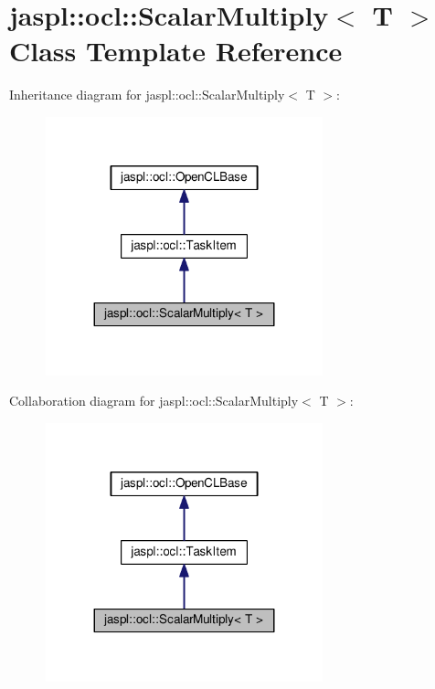 \hypertarget{classjaspl_1_1ocl_1_1_scalar_multiply}{}\section{jaspl\+:\+:ocl\+:\+:Scalar\+Multiply$<$ T $>$ Class Template Reference}
\label{classjaspl_1_1ocl_1_1_scalar_multiply}


Inheritance diagram for jaspl\+:\+:ocl\+:\+:Scalar\+Multiply$<$ T $>$\+:\nopagebreak
\begin{figure}[H]
\begin{center}
\leavevmode
\includegraphics[width=227pt]{classjaspl_1_1ocl_1_1_scalar_multiply__inherit__graph}
\end{center}
\end{figure}


Collaboration diagram for jaspl\+:\+:ocl\+:\+:Scalar\+Multiply$<$ T $>$\+:\nopagebreak
\begin{figure}[H]
\begin{center}
\leavevmode
\includegraphics[width=227pt]{classjaspl_1_1ocl_1_1_scalar_multiply__coll__graph}
\end{center}
\end{figure}
